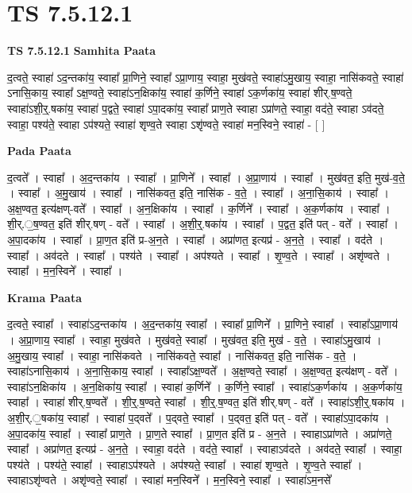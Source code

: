\documentclass[17pt]{extarticle}
\begin{document}
\section{ TS 7.5.12.1 }

\textbf{TS 7.5.12.1 } \newline
\textbf{Samhita Paata} \newline

द॒त्वते॒ स्वाहा॑ ऽद॒न्तका॑य॒ स्वाहा᳚ प्रा॒णिने॒ स्वाहा᳚ ऽप्रा॒णाय॒ स्वाहा॒ मुख॑वते॒ स्वाहा॑ऽमु॒खाय॒ स्वाहा॒ नासि॑कवते॒ स्वाहा॑ ऽनासि॒काय॒ स्वाहा᳚ ऽक्ष॒ण्वते॒ स्वाहा॑ऽन॒क्षिका॑य॒ स्वाहा॑ क॒र्णिने॒ स्वाहा॑ ऽक॒र्णका॑य॒ स्वाहा॑ शीर्.ष॒ण्वते॒ स्वाहा॑ऽशी॒र्॒.षका॑य॒ स्वाहा॑ प॒द्वते॒ स्वाहा॑ ऽपा॒दका॑य॒ स्वाहा᳚ प्राण॒ते स्वाहा ऽप्रा॑णते॒ स्वाहा॒ वद॑ते॒ स्वाहा ऽव॑दते॒ स्वाहा॒ पश्य॑ते॒ स्वाहा ऽप॑श्यते॒ स्वाहा॑ शृण्व॒ते स्वाहा ऽशृ॑ण्वते॒ स्वाहा॑ मन॒स्विने॒ स्वाहा॑ - [  ] \newline

\textbf{Pada Paata} \newline

द॒त्वते᳚ । स्वाहा᳚ । अ॒द॒न्तका॑य । स्वाहा᳚ । प्रा॒णिने᳚ । स्वाहा᳚ । अ॒प्रा॒णाय॑ । स्वाहा᳚ । मुख॑वत॒ इति॒ मुख॑-व॒ते॒ । स्वाहा᳚ । अ॒मु॒खाय॑ । स्वाहा᳚ । नासि॑कवत॒ इति॒ नासि॑क - व॒ते॒ । स्वाहा᳚ । अ॒ना॒सि॒काय॑ । स्वाहा᳚ । अ॒क्ष॒ण्वत॒ इत्य॑क्षण्-वते᳚ । स्वाहा᳚ । अ॒न॒क्षिका॑य । स्वाहा᳚ । क॒र्णिने᳚ । स्वाहा᳚ । अ॒क॒र्णका॑य । स्वाहा᳚ । शी॒र्.॒ष॒ण्वत॒ इति॑ शीर्.षण् - वते᳚ । स्वाहा᳚ । अ॒शी॒र्॒.षका॑य । स्वाहा᳚ । प॒द्वत॒ इति॑ पत् - वते᳚ । स्वाहा᳚ । अ॒पा॒दका॑य । स्वाहा᳚ । प्रा॒ण॒त इति॑ प्र-अ॒न॒ते । स्वाहा᳚ । अप्रा॑णत॒ इत्यप्र॑ - अ॒न॒ते॒ । स्वाहा᳚ । वद॑ते । स्वाहा᳚ । अव॑दते । स्वाहा᳚ । पश्य॑ते । स्वाहा᳚ । अप॑श्यते । स्वाहा᳚ । शृ॒ण्व॒ते । स्वाहा᳚ । अशृ॑ण्वते । स्वाहा᳚ । म॒न॒स्विने᳚ । स्वाहा᳚ ।  \newline


\textbf{Krama Paata} \newline

द॒त्वते॒ स्वाहा᳚ । स्वाहा॑ऽद॒न्तका॑य । अ॒द॒न्तका॑य॒ स्वाहा᳚ । स्वाहा᳚ प्रा॒णिने᳚ । प्रा॒णिने॒ स्वाहा᳚ । स्वाहा᳚ऽप्रा॒णाय॑ । अ॒प्रा॒णाय॒ स्वाहा᳚ । स्वाहा॒ मुख॑वते । मुख॑वते॒ स्वाहा᳚ । मुख॑वत॒ इति॒ मुख॑ - व॒ते॒ । स्वाहा॑ऽमु॒खाय॑ । अ॒मु॒खाय॒ स्वाहा᳚ । स्वाहा॒ नासि॑कवते । नासि॑कवते॒ स्वाहा᳚ । नासि॑कवत॒ इति॒ नासि॑क - व॒ते॒ । स्वाहा॑ऽनासि॒काय॑ । अ॒ना॒सि॒काय॒ स्वाहा᳚ । स्वाहा᳚ऽक्ष॒ण्वते᳚ । अ॒क्ष॒ण्वते॒ स्वाहा᳚ । अ॒क्ष॒ण्वत॒ इत्य॑क्षण् - वते᳚ । स्वाहा॑ऽन॒क्षिका॑य । अ॒न॒क्षिका॑य॒ स्वाहा᳚ । स्वाहा॑ क॒र्णिने᳚ । क॒र्णिने॒ स्वाहा᳚ । स्वाहा॑ऽक॒र्णका॑य । अ॒क॒र्णका॑य॒ स्वाहा᳚ । स्वाहा॑ शीर्.ष॒ण्वते᳚ । शी॒र्॒.ष॒ण्वते॒ स्वाहा᳚ । शी॒र्॒.ष॒ण्वत॒ इति॑ शीर्.षण् - वते᳚ । स्वाहा॑ऽशी॒र्॒.षका॑य । अ॒शी॒र्.॒षका॑य॒ स्वाहा᳚ । स्वाहा॑ प॒द्‍वते᳚ । प॒द्‍वते॒ स्वाहा᳚ । प॒द्‍वत॒ इति॑ पत् - वते᳚ । स्वाहा॑ऽपा॒दका॑य । अ॒पा॒दका॑य॒ स्वाहा᳚ । स्वाहा᳚ प्राण॒ते । प्रा॒ण॒ते स्वाहा᳚ । प्रा॒ण॒त इति॑ प्र - अ॒न॒ते । स्वाहाऽप्रा॑णते । अप्रा॑णते॒ स्वाहा᳚ । अप्रा॑णत॒ इत्यप्र॑ - अ॒न॒ते॒ । स्वाहा॒ वद॑ते । वद॑ते॒ स्वाहा᳚ । स्वाहाऽव॑दते । अव॑दते॒ स्वाहा᳚ । स्वाहा॒ पश्य॑ते । पश्य॑ते॒ स्वाहा᳚ । स्वाहाऽप॑श्यते । अप॑श्यते॒ स्वाहा᳚ । स्वाहा॑ शृण्व॒ते । शृ॒ण्व॒ते स्वाहा᳚ । स्वाहाऽशृ॑ण्वते । अशृ॑ण्वते॒ स्वाहा᳚ । स्वाहा॑ मन॒स्विने᳚ । म॒न॒स्विने॒ स्वाहा᳚ । स्वाहा॑ऽम॒नसे᳚ \newline
\end{document}
